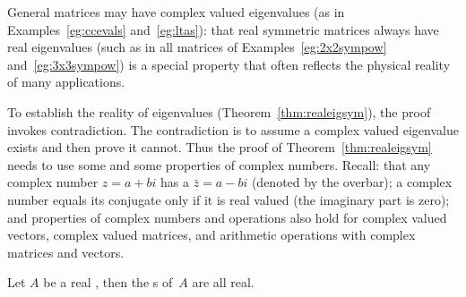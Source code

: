 General matrices may have complex valued eigenvalues (as in Examples~\ref{eg:ccevals} and~\ref{eg:ltas}): that real symmetric matrices always have real eigenvalues (such as in all matrices of Examples~\ref{eg:2x2sympow} and~\ref{eg:3x3sympow}) is a special property that often reflects the physical reality of many applications.

To establish the reality of eigenvalues (Theorem~\ref{thm:realeigsym}), the proof invokes contradiction. 
The contradiction is to assume a complex valued eigenvalue exists and then prove it cannot.
Thus the proof of Theorem~\ref{thm:realeigsym} needs to use some  and some properties of complex numbers.
Recall: that any complex number \(z=a+bi\) has a  \(\bar z=a-bi\) (denoted by the overbar); a complex number equals its conjugate only if it is real valued (the imaginary part is zero); and properties of complex numbers and operations also hold for complex valued vectors, complex valued matrices, and arithmetic operations with complex matrices and vectors.





\begin{theorem} \label{thm:realeigsym} 
Let \(A\) be a real , then the s of~\(A\) are all real.
\end{theorem}


